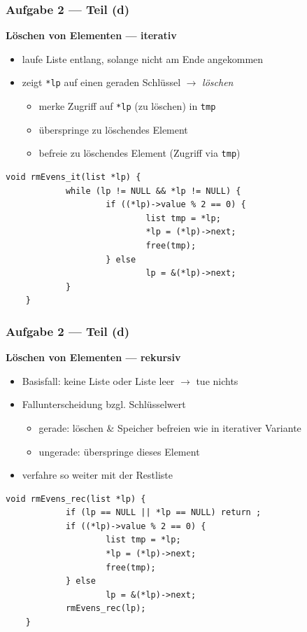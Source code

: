 \documentclass{beamer}
\newcommand*{\ttfamilywithbold}{\fontfamily{lmtt}\selectfont}
\begin{document}
\begin{frame}[fragile] \frametitle{Aufgabe 2 --- Teil (d)}
	\textbf{Löschen von Elementen --- iterativ}
	\begin{itemize}
		\item laufe Liste entlang, solange nicht am Ende angekommen
		\item zeigt \texttt{*lp} auf einen geraden Schlüssel $\to$  \textit{löschen}
		\begin{itemize}
			\item merke Zugriff auf \texttt{*lp} (zu löschen) in \texttt{tmp}
			\item überspringe zu löschendes Element
			\item befreie zu löschendes Element (Zugriff via \texttt{tmp})
		\end{itemize}
	\end{itemize}
	
	\pause
	
	\begin{lstlisting}[style=notebook, basicstyle=\scriptsize\ttfamilywithbold]
	void rmEvens_it(list *lp) {
			while (lp != NULL && *lp != NULL) {
					if ((*lp)->value % 2 == 0) {
							list tmp = *lp;
							*lp = (*lp)->next;
							free(tmp);
					} else
							lp = &(*lp)->next;
			}
	}
	\end{lstlisting}
\end{frame}

\begin{frame}[fragile] \frametitle{Aufgabe 2 --- Teil (d)}
	\textbf{Löschen von Elementen --- rekursiv} \small
	\begin{itemize}
		\item Basisfall: keine Liste oder Liste leer $\to$ tue nichts
		\item Fallunterscheidung bzgl. Schlüsselwert
		\begin{itemize} \footnotesize
			\item gerade: löschen \& Speicher befreien wie in iterativer Variante
			\item ungerade: überspringe dieses Element
		\end{itemize}
		\item verfahre so weiter mit der Restliste
	\end{itemize}
	
	\pause
	
	\begin{lstlisting}[style=notebook, basicstyle=\scriptsize\ttfamilywithbold]
	void rmEvens_rec(list *lp) { 
			if (lp == NULL || *lp == NULL) return ;
			if ((*lp)->value % 2 == 0) {
					list tmp = *lp;
					*lp = (*lp)->next;
					free(tmp);
			} else
					lp = &(*lp)->next;
			rmEvens_rec(lp);  
	}
	\end{lstlisting}
\end{frame}
\end{document}
